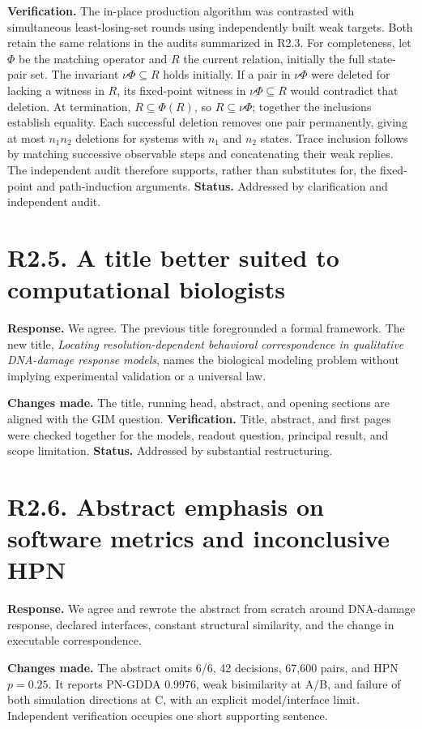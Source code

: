 \documentclass[11pt]{article}
\begin{document}
\textbf{Verification.} The in-place production algorithm was contrasted with
simultaneous least-losing-set rounds using independently built weak targets.
Both retain the same relations in the audits summarized in R2.3.
For completeness, let $\Phi$ be the matching operator and $R$ the current
relation, initially the full state-pair set. The invariant $\nu\Phi\subseteq R$
holds initially. If a pair in $\nu\Phi$ were deleted for lacking a witness
in $R$, its fixed-point witness in $\nu\Phi\subseteq R$ would contradict that
deletion. At termination, $R\subseteq\Phi(R)$, so $R\subseteq\nu\Phi$;
together the inclusions establish equality. Each successful deletion removes
one pair permanently, giving at most $n_1n_2$ deletions for systems with
$n_1$ and $n_2$ states. Trace inclusion follows by matching successive
observable steps and concatenating their weak replies. The independent audit
therefore supports, rather than substitutes for, the fixed-point and
path-induction arguments.
\textbf{Status.} Addressed by clarification and independent audit.

\section*{R2.5. A title better suited to computational biologists}
\textbf{Response.} We agree. The previous title foregrounded a formal framework.
The new title, \emph{Locating resolution-dependent behavioral correspondence in
qualitative DNA-damage response models}, names the biological modeling problem
without implying experimental validation or a universal law.

\textbf{Changes made.} The title, running head, abstract, and opening sections
are aligned with the GIM question.
\textbf{Verification.} Title, abstract, and first pages were checked together
for the models, readout question, principal result, and scope limitation.
\textbf{Status.} Addressed by substantial restructuring.

\section*{R2.6. Abstract emphasis on software metrics and inconclusive HPN}
\textbf{Response.} We agree and rewrote the abstract from scratch around
DNA-damage response, declared interfaces, constant structural similarity, and
the change in executable correspondence.

\textbf{Changes made.} The abstract omits 6/6, 42 decisions, 67,600 pairs, and
HPN $p=0.25$. It reports PN-GDDA 0.9976, weak bisimilarity at A/B, and failure
of both simulation directions at C, with an explicit model/interface limit.
Independent verification occupies one short supporting sentence.
\end{document}
